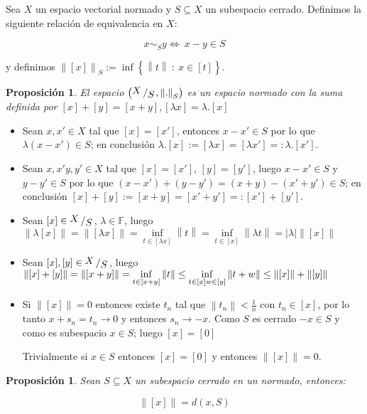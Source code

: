 \documentclass[11pt]{article}
\newcommand{\norm}[1]{\left\lVert#1\right\rVert}
\newcommand{\abs}[1]{\left\lvert#1\right\rvert}
\newcommand{\sett}[1]{\left\lbrace#1\right\rbrace}
\newcommand{\quotient}[2]{{\raisebox{.2em}{$#1$}\left/\raisebox{-.2em}{$#2$}\right.}}
\numberwithin{theorem}{subsection}
\newtheorem{proposition}[theorem]{Proposici\'on}
\newenvironment{proof}[1][Demostraci\'on]{\begin{trivlist}
		\item[\hskip \labelsep {\bfseries #1}]}{\end{trivlist}}
\newcommand{\qed}{\nobreak \ifvmode \relax \else
	\ifdim\lastskip<1.5em \hskip-\lastskip
	\hskip1.5em plus0em minus0.5em \fi \nobreak
	\vrule height0.75em width0.5em depth0.25em\fi}
\begin{document}
Sea $X$ un espacio vectorial normado y $S \subseteq X$ un subespacio cerrado. Definimos la siguiente relaci\'on de equivalencia en $X$:

\[
x \sim_S y \Longleftrightarrow \ x-y \in S
\]

y definimos $\norm{[x]}_S := \inf \sett{\norm{t} \ : \ x \in [t]}$.


\begin{proposition}
	El espacio $\left(\quotient{X}{S}, \norm{.}_S \right)$ es un espacio normado con la suma definida por $[x] + [y] = [x+y], [\lambda x] = \lambda.[x]$
\end{proposition}

\begin{proof}
	\begin{itemize}
		\item Sean $x,x' \in X$ tal que $[x] = [x']$, entonces $x - x' \in S$ por lo que $\lambda(x-x') \in S$; en conclusi\'on $\lambda . [x] := [\lambda x] = [\lambda x'] =: \lambda . [x']$.
		\item Sean $x,x'y,y' \in X$ tal que $[x] = [x']$, $[y] = [y']$, luego $x-x' \in S$ y $y-y' \in S$ por lo que $(x-x') + (y-y') = (x+y) - (x'+y') \in S$; en conclusi\'on $[x] + [y] := [x+y] = [x' + y'] =: [x'] + [y']$.
		\item Sean $[x] \in \quotient{X}{S}$, $\lambda \in \mathbb{F}$, luego $\norm{\lambda [x]} = \norm{[\lambda x]} = \inf\limits_{t \in [\lambda x]}{\norm{t}} = \inf\limits_{t \in [x]}{\norm{\lambda t}} = \abs{\lambda} \norm{[x]}$
		\item Sean $[x],[y] \in \quotient{X}{S}$, luego $\norm{[x] + [y]} = \norm{[x+y]} = \inf\limits_{t \in [x + y]}{\norm{t}} \leq \inf\limits_{t \in [x] \\ w \in [y]}{\norm{t+w}} \leq \norm{[x]} + \norm{[y]}$
		\item Si $\norm{[x]} = 0$ entonces existe $t_n$ tal que $\norm{t_n} < \frac{1}{n}$ con $t_n \in [x]$, por lo tanto $x + s_n = t_n \rightarrow 0$ y entonces $s_n \rightarrow -x$. Como $S$ es cerrado $-x \in S$ y como es subespacio $x \in S$; luego $[x]=[0]$
		
		Trivialmente si $x \in S$ entonces $[x] = [0]$ y entonces $\norm{[x]} = 0$. \qed
		
	\end{itemize}
\end{proof}

\begin{proposition}
	Sean $S \subseteq X$ un subespacio cerrado en un normado, entonces:
	
	\[
		\norm{[x]} = d(x,S)
	\]
	
\end{proposition}
\end{document}
